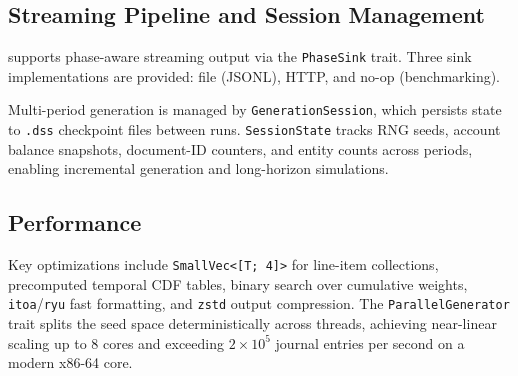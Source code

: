 \subsection{Streaming Pipeline and Session Management}
\label{sec:arch_streaming}

\system{} supports phase-aware streaming output via the
\texttt{PhaseSink} trait.  Three sink implementations are provided:
file (JSONL), HTTP, and no-op (benchmarking).

Multi-period generation is managed by \texttt{GenerationSession}, which
persists state to \texttt{.dss} checkpoint files between runs.
\texttt{SessionState} tracks RNG seeds, account balance snapshots,
document-ID counters, and entity counts across periods, enabling
incremental generation and long-horizon simulations.

\subsection{Performance}
\label{sec:arch_performance}

Key optimizations include \texttt{SmallVec<[T; 4]>} for line-item
collections, precomputed temporal CDF tables, binary search over
cumulative weights, \texttt{itoa}/\texttt{ryu} fast formatting, and
\texttt{zstd} output compression.  The \texttt{ParallelGenerator}
trait splits the seed space deterministically across threads,
achieving near-linear scaling up to 8 cores and exceeding
$2 \times 10^5$ journal entries per second on a modern x86-64 core.
